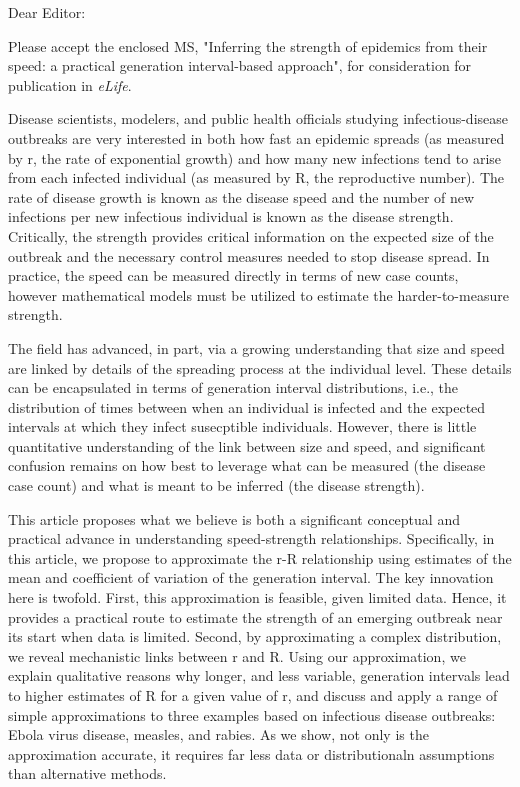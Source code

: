 \documentclass[10pt]{letter}
\begin{document}
\date{\today}

\signature{Sang Woo Park, David Champredon, Joshua S. Weitz, and Jonathan Dushoff (corresponding author)}

\begin{letter}{
}

\opening{Dear Editor:}

Please accept the enclosed MS, "Inferring the strength of epidemics from their speed: a practical generation interval-based approach", for consideration for publication in \emph{eLife}.

Disease scientists, modelers, and public health officials studying infectious-disease outbreaks are very interested in both how fast an epidemic spreads (as measured by r, the rate of exponential growth) and how many new infections tend to arise from each infected individual (as measured by R, the reproductive number). The rate of disease growth is known as the disease speed and the number of new infections per new infectious individual is known as the disease strength.  Critically, the strength provides critical information on the expected size of the outbreak and the necessary control measures needed to stop disease spread.  In practice, the speed can be measured directly in terms of new case counts, however mathematical models must be utilized to estimate the harder-to-measure strength.

The field has advanced, in part, via  a growing understanding that size and speed are linked by details of the spreading process at the individual level. These details can be encapsulated in terms of generation interval distributions, i.e., the distribution of times between when an individual is infected and the expected intervals at which they infect susecptible individuals.  However, there is little quantitative understanding of the link between size and speed, and significant confusion remains on how best to leverage what can be measured (the disease case count) and what is meant to be inferred (the disease strength). 

This article proposes what we believe is both a significant conceptual and practical advance in understanding speed-strength relationships. Specifically, in this article, we propose to approximate the r-R relationship using estimates of the mean and coefficient of variation of the generation interval. The key innovation here is twofold. First, this approximation is feasible, given limited data. Hence, it provides a practical route to estimate the strength of an emerging outbreak near its start when data is limited. Second, by approximating a complex distribution, we reveal mechanistic links between r and R. Using our approximation, we explain qualitative reasons why longer, and less variable, generation intervals lead to higher estimates of R for a given value of r, and discuss and apply a range of simple approximations to three examples based on infectious disease outbreaks: Ebola virus disease, measles, and rabies. As we show, not only is the approximation accurate, it requires far less data or distributionaln assumptions than alternative methods.


\end{letter}
\end{document}
